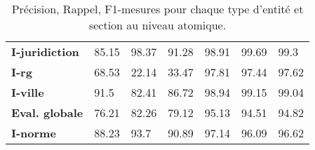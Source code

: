 \begin{table}[!h]
\begin{tabular}{|l|l|l|l|l|l|l|}
		\textbf{I-juridiction} & 85.15              & 98.37           & 91.28       & 98.91              & 99.69           & 99.3        \\ 
		\textbf{I-rg}          & 68.53              & 22.14           & 33.47       & 97.81              & 97.44           & 97.62       \\ 
		\textbf{I-ville}       & 91.5               & 82.41           & 86.72       & 98.94              & 99.15           & 99.04       \\ \hline
		\textbf{Eval. globale}       & 76.21              & 82.26           & 79.12       & 95.13              & 94.51           & 94.82       \\ \hline
		\noalign{\smallskip}\hline\noalign{\smallskip}
		\textbf{I-norme}       & 88.23              & 93.7            & 90.89       & 97.14              & 96.09           & 96.62       \\ \hline
	\end{tabular}
	\caption{Précision, Rappel, F1-mesures pour chaque type d'entité et section au niveau atomique.}\label{tab:structuration:perf-detail-token}
\end{table}


